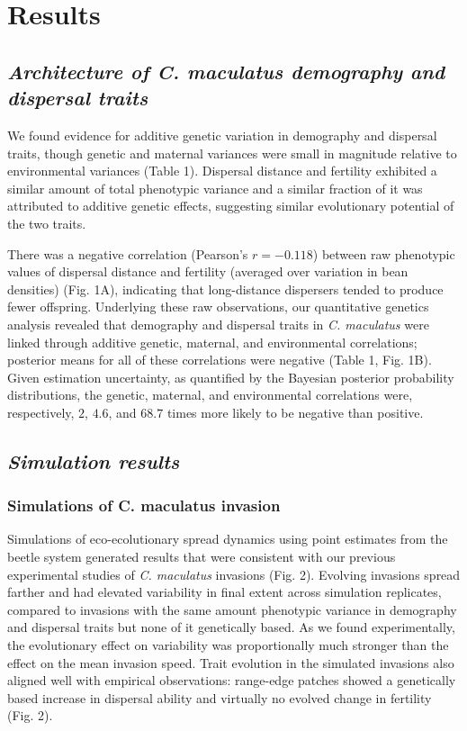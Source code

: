 \documentclass[11pt]{article}
\begin{document}
\section*{Results}

\subsection*{\textit{Architecture of \textup{C. maculatus} demography and dispersal traits}}
%

We found evidence for additive genetic variation in demography and dispersal traits, though genetic and maternal variances were small in magnitude relative to environmental variances (Table 1). 
Dispersal distance and fertility exhibited a similar amount of total phenotypic variance and a similar fraction of it was attributed to additive genetic effects, suggesting similar evolutionary potential of the two traits.

There was a negative correlation (Pearson's $r = -0.118$) between raw phenotypic values of dispersal distance and fertility (averaged over variation in bean densities) (Fig. 1A), indicating that long-distance dispersers tended to produce fewer offspring.
Underlying these raw observations, our quantitative genetics analysis revealed that demography and dispersal traits in \textit{C. maculatus} were linked through additive genetic, maternal, and environmental correlations; posterior means for all of these correlations were negative (Table 1, Fig. 1B). 
Given estimation uncertainty, as quantified by the Bayesian posterior probability distributions, the genetic, maternal, and environmental correlations were, respectively, $2$, $4.6$, and $68.7$ times more likely to be negative than positive.

\subsection*{\textit{Simulation results}}
\subsubsection*{Simulations of \textup{C. maculatus} invasion}
Simulations of eco-ecolutionary spread dynamics using point estimates from the beetle system generated results that were consistent with our previous experimental studies of \textit{C. maculatus} invasions (Fig. 2).
Evolving invasions spread farther and had elevated variability in final extent across simulation replicates, compared to invasions with the same amount phenotypic variance in demography and dispersal traits but none of it genetically based.
As we found experimentally, the evolutionary effect on variability was proportionally much stronger than the effect on the mean invasion speed.
Trait evolution in the simulated invasions also aligned well with empirical observations: range-edge patches showed a genetically based increase in dispersal ability and virtually no evolved change in fertility (Fig. 2).
\end{document}
